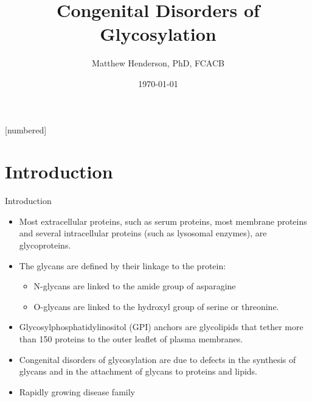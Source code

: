 \documentclass[presentation, smaller]{beamer}
\author{Matthew Henderson, PhD, FCACB}
\date{\today}
\title{Congenital Disorders of Glycosylation}
\institute[NSO]{Newborn Screening Ontario | The University of Ottawa}
\begin{document}
\maketitle


\vspace{220pt}
\beamertemplatenavigationsymbolsempty
{}[numbered]

\section{Introduction}
\label{sec:orgbc5cdfa}

\begin{frame}[label={sec:orgc2425cd}]{Introduction}
\begin{itemize}
\item Most extracellular proteins, such as serum proteins, most membrane proteins and several intracellular proteins (such as lysosomal enzymes), are glycoproteins.
\item The glycans are defined by their linkage to the protein:
\begin{itemize}
\item N-glycans are linked to the amide group of asparagine
\item O-glycans are linked to the hydroxyl group of serine or
threonine.
\end{itemize}

\item Glycosylphosphatidylinositol (GPI) anchors are glycolipids that
tether more than 150 proteins to the outer leaflet of plasma
membranes.

\item Congenital disorders of glycosylation are due to defects in the
synthesis of glycans and in the attachment of glycans to proteins
and lipids.
\item Rapidly growing disease family
\end{itemize}
\end{frame}
\end{document}
